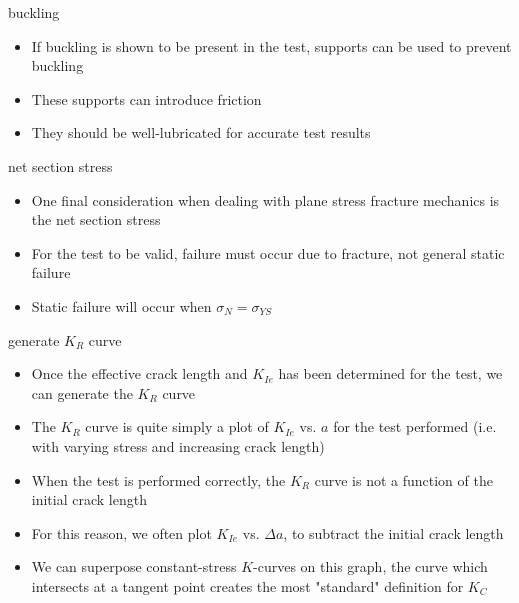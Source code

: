 \documentclass[10pt]{beamer}
\begin{document}
\begin{frame}{buckling}
	\begin{itemize}
		\item If buckling is shown to be present in the test, supports can be used to prevent buckling
		\item These supports can introduce friction
		\item They should be well-lubricated for accurate test results
	\end{itemize}
\end{frame}

\begin{frame}{net section stress}
	\begin{itemize}
		\item One final consideration when dealing with plane stress fracture mechanics is the net section stress
		\item For the test to be valid, failure must occur due to fracture, not general static failure
		\item Static failure will occur when $\sigma_{N} = \sigma_{YS}$
	\end{itemize}
\end{frame}

\begin{frame}{generate $K_R$ curve}
	\begin{itemize}[<+->]
		\item Once the effective crack length and $K_{Ie}$ has been determined for the test, we can generate the $K_R$ curve
		\item The $K_R$ curve is quite simply a plot of $K_{Ie}$ vs. $a$ for the test performed (i.e. with varying stress and increasing crack length)
		\item When the test is performed correctly, the $K_R$ curve is not a function of the initial crack length
		\item For this reason, we often plot $K_{Ie}$ vs. $\Delta a$, to subtract the initial crack length
		\item We can superpose constant-stress $K$-curves on this graph, the curve which intersects at a tangent point creates the most "standard" definition for $K_C$
	\end{itemize}
\end{frame}
\end{document}
